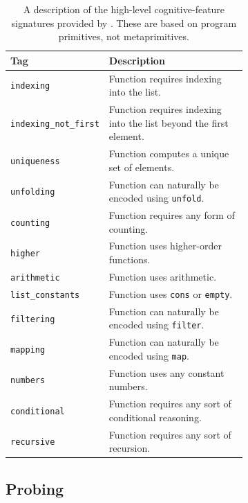 \documentclass[12pt]{article}
\begin{document}
\begin{table}[!htbp]
\centering
\caption{A description of the high-level cognitive-feature signatures provided by \citet{rule2024symbolic}. These are based on program primitives, not metaprimitives.}
\label{tab:cognitive-tags}
\small
\begin{tabular}{lp{0.68\linewidth}}
\toprule
Tag & Description \\
\midrule
\texttt{indexing} & Function requires indexing into the list. \\
\texttt{indexing\_not\_first} & Function requires indexing into the list beyond the first element. \\
\texttt{uniqueness} & Function computes a unique set of elements. \\
\texttt{unfolding} & Function can naturally be encoded using \texttt{unfold}. \\
\texttt{counting} & Function requires any form of counting. \\
\texttt{higher} & Function uses higher-order functions. \\
\texttt{arithmetic} & Function uses arithmetic. \\
\texttt{list\_constants} & Function uses \texttt{cons} or \texttt{empty}. \\
\texttt{filtering} & Function can naturally be encoded using \texttt{filter}. \\
\texttt{mapping} & Function can naturally be encoded using \texttt{map}. \\
\texttt{numbers} & Function uses any constant numbers. \\
\texttt{conditional} & Function requires any sort of conditional reasoning. \\
\texttt{recursive} & Function requires any sort of recursion. \\
\bottomrule
\end{tabular}
\end{table}

\subsection{Probing}
\end{document}
